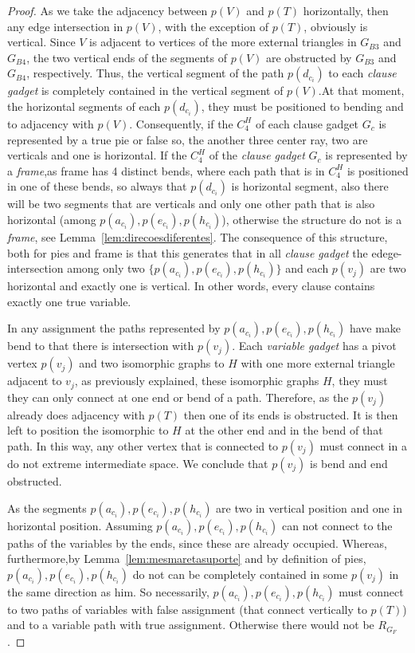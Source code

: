 \documentclass[a4paper,11pt]{article}
\begin{document}
\begin{proof}
As we take the adjacency between $p(V)$ and $p(T)$ horizontally, then any edge intersection in $p(V)$, with the exception of $p(T)$, obviously is vertical. Since $V$ is adjacent to vertices of the more external triangles in $G_{B3}$ and $G_{B4}$, the two vertical ends of the segments of $p(V)$ are obstructed by $G_{B3}$ and $G_{B4}$, respectively. Thus, the vertical segment of the path $p(d_{c_i})$ to each \textit{clause gadget} is completely contained in the vertical segment of $p(V)$.At that moment, the horizontal segments of each $p(d_{c_i})$, they must be positioned  to bending and to adjacency with $p(V)$. Consequently, if the $C_4^H$ of each clause gadget $G_c$ is  represented by a true pie or false so, the another three center ray, two are verticals and one is horizontal. If the $C_4^H$ of the \textit{clause gadget} $G_c$ is represented by a  \textit{frame},as frame has 4 distinct bends, where each path that is in $C_4^H$ is positioned in one of these bends, so always that $p(d_{c_i})$ is horizontal segment, also there will be two segments that are verticals and only one other path that is also horizontal (among $p(a_{c_i}),p(e_{c_i}), p(h_{c_i})$), otherwise the structure do not is a  \textit{frame}, see Lemma~\ref{lem:direcoesdiferentes}. The consequence of this structure, both for pies and frame is that this generates that in all \textit{clause gadget} the edege-intersection among only two $\{p(a_{c_i}), p(e_{c_i}), p(h_{c_i})\}$ and each $p(v_{j})$ are two horizontal and exactly one is vertical. In other words, every clause contains exactly one true variable.

In any assignment the paths represented by $p(a_{c_i}), p(e_{c_i}), p(h_{c_i})$ have make bend to that there is intersection with $p(v_{j})$. Each \textit{variable gadget} has a pivot vertex  $p(v_{j})$ and two isomorphic graphs to $H$ with one more external triangle adjacent to $v_j$, as previously explained, these isomorphic graphs $H$, they must they can only connect at one end or bend of a path. Therefore, as the $p(v_{j})$ already does  adjacency with $p(T)$ then one of its ends is obstructed. It is then left to position the isomorphic to $H$ at the other end and in the bend of that path. In this way, any other vertex that is connected to   $p(v_{j})$ must connect in a do not extreme intermediate space. We conclude that $p(v_{j})$ is bend and end obstructed. 

As the segments $p(a_{c_i}), p(e_{c_i}), p(h_{c_i})$ are two in vertical position and one  in horizontal position. Assuming $p(a_{c_i}), p(e_{c_i}), p(h_{c_i})$ can not connect to the paths of the variables by the ends, since these are already occupied. Whereas, furthermore,by Lemma~\ref{lem:mesmaretasuporte} and by definition of pies, $p(a_{c_i}), p(e_{c_i}), p(h_{c_i})$ do not can be completely contained in some $p(v_j)$ in the same direction as him. So necessarily, $p(a_{c_i}), p(e_{c_i}), p(h_{c_i})$ must connect to two paths of variables with false assignment (that connect vertically to
 $p(T)$) and to a variable path with true assignment. Otherwise there would not be $R_{G_F}$.



\end{proof}
\end{document}
